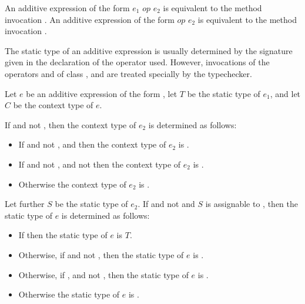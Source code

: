 \documentclass[makeidx]{article}
\begin{document}
{\LMHash{}%
An additive expression of the form $e_1$ $op$ $e_2$ is equivalent to
the method invocation .
An additive expression of the form \SUPER{} $op$ $e_2$ is equivalent to
the method invocation .

\LMHash{}%
The static type of an additive expression is usually determined
by the signature given in the declaration of the operator used.
However, invocations of the operators \code{+} and \code{-} of
class ,  and 
are treated specially by the typechecker.

\LMHash{}%
Let $e$ be an additive expression of the form ,
let $T$ be the static type of $e_1$,
and let $C$ be the context type of $e$.

If  and not , then
the context type of $e_2$ is determined as follows:

\begin{itemize}
  \item{} If  and not ,
      and 
      then the context type of $e_2$ is .
  \item{} If  and not ,
      and not 
     then the context type of $e_2$ is .
  \item{} Otherwise the context type of $e_2$ is .
\end{itemize}

\LMHash{}%
Let further $S$ be the static type of $e_2$.
If  and not 
and $S$ is assignable to ,
then the static type of $e$ is determined as follows:

\begin{itemize}
  \item{} If 
    then the static type of $e$ is $T$.
  \item{} Otherwise, if 
    and not ,
    then the static type of $e$ is .
  \item{} Otherwise, if ,
     and not ,
    then the static type of $e$ is .
  \item{} Otherwise the static type of $e$ is .
\end{itemize}

}
\end{document}
